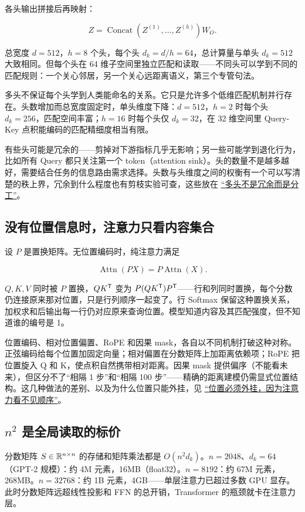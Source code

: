各头输出拼接后再映射：

\[
Z = \operatorname{Concat}(Z^{(1)},\ldots,Z^{(h)})W_O.
\]

总宽度 \(d=512\)，\(h=8\) 个头，每个头 \(d_k=d/h=64\)，总计算量与单头 \(d_k=512\) 大致相同。但每个头在 64 维子空间里独立匹配和读取——不同头可以学到不同的匹配规则：一个关心邻居，另一个关心远距离语义，第三个专管句法。

多头不保证每个头学到人类能命名的关系。它只是允许多个低维匹配机制并行存在。头数增加而总宽度固定时，单头维度下降：\(d=512\)，\(h=2\) 时每个头 \(d_k=256\)，匹配空间丰富；\(h=16\) 时每个头仅 \(d_k=32\)，在 32 维空间里 Query-Key 点积能编码的匹配精细度相当有限。

有些头可能是冗余的——剪掉对下游指标几乎无影响；另一些可能学到退化行为，比如所有 Query 都只关注第一个 token（attention sink）。头的数量不是越多越好，需要结合任务的信息路由需求选择。头数与头维度之间的权衡有一个可以写清楚的秩上界，冗余到什么程度也有剪枝实验可查，这些放在 \hyperref[sec:14-Deep-Learning/05-Attention-and-Sequence-Models/02]{``多头不是冗余而是分工''}。

\subsection{没有位置信息时，注意力只看内容集合}

设 \(P\) 是置换矩阵。无位置编码时，纯注意力满足

\[
\operatorname{Attn}(PX) = P\operatorname{Attn}(X).
\]

\(Q,K,V\) 同时被 \(P\) 置换，\(QK^{\mathsf{T}}\) 变为 \(P(QK^{\mathsf{T}})P^{\mathsf{T}}\)——行和列同时置换，每个分数仍连接原来那对位置，只是行列顺序一起变了。行 Softmax 保留这种置换关系，加权求和后输出每一行仍对应原来查询位置。模型知道内容及其匹配强度，但不知道谁的编号是 1。

位置编码、相对位置偏置、RoPE 和因果 mask，各自以不同机制打破这种对称。正弦编码给每个位置加固定向量；相对偏置在分数矩阵上加距离依赖项；RoPE 把位置旋入 Q 和 K，使点积自然携带相对距离。因果 mask 提供偏序（不能看未来），但区分不了``相隔 1 步''和``相隔 100 步''——精确的距离建模仍需显式位置结构。这几种做法的差别、以及为什么位置只能外挂，见 \hyperref[sec:14-Deep-Learning/05-Attention-and-Sequence-Models/03]{``位置必须外挂，因为注意力看不见顺序''}。

\subsection{\(n^2\) 是全局读取的标价}

分数矩阵 \(S\in\mathbb{R}^{n\times n}\) 的存储和矩阵乘法都是 \(O(n^2 d_k)\)。\(n=2048\)、\(d_k=64\)（GPT-2 规模）：约 4M 元素，16MB（float32）。\(n=8192\)：约 67M 元素，268MB。\(n=32768\)：约 1B 元素，4GB——单层注意力已超过多数 GPU 显存。此时分数矩阵远超线性投影和 FFN 的总开销，Transformer 的瓶颈就卡在注意力层。

